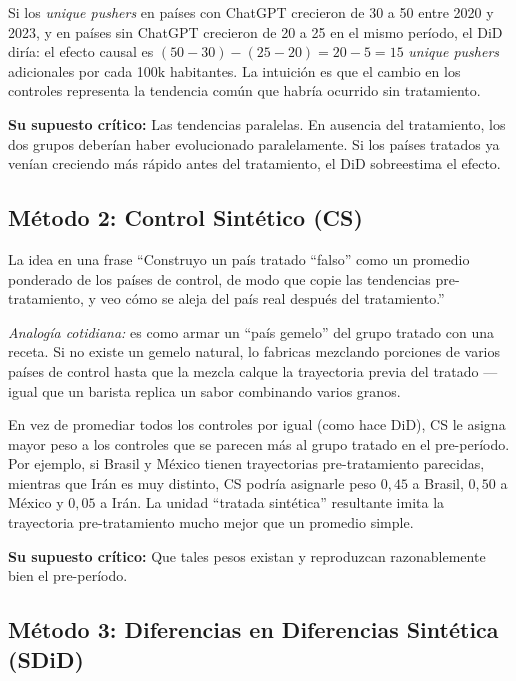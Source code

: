 \documentclass[11pt,a4paper]{article}
\begin{document}
Si los \textit{unique pushers} en países con ChatGPT crecieron de 30 a 50 entre 2020 y 2023, y en países sin ChatGPT crecieron de 20 a 25 en el mismo período, el DiD diría: el efecto causal es $(50-30) - (25-20) = 20 - 5 = 15$ \textit{unique pushers} adicionales por cada 100k habitantes. La intuición es que el cambio en los controles representa la tendencia común que habría ocurrido sin tratamiento.

\textbf{Su supuesto crítico:} Las tendencias paralelas. En ausencia del tratamiento, los dos grupos deberían haber evolucionado paralelamente. Si los países tratados ya venían creciendo más rápido antes del tratamiento, el DiD sobreestima el efecto.

\subsection{Método 2: Control Sintético (CS)}

\begin{ideabox}{La idea en una frase}
``Construyo un país tratado ``falso'' como un promedio ponderado de los países de control, de modo que copie las tendencias pre-tratamiento, y veo cómo se aleja del país real después del tratamiento.''
\end{ideabox}

\textit{Analogía cotidiana:} es como armar un ``país gemelo'' del grupo tratado con una receta. Si no existe un gemelo natural, lo fabricas mezclando porciones de varios países de control hasta que la mezcla calque la trayectoria previa del tratado —igual que un barista replica un sabor combinando varios granos.

En vez de promediar todos los controles por igual (como hace DiD), CS le asigna mayor peso a los controles que se parecen más al grupo tratado en el pre-período. Por ejemplo, si Brasil y México tienen trayectorias pre-tratamiento parecidas, mientras que Irán es muy distinto, CS podría asignarle peso $0{,}45$ a Brasil, $0{,}50$ a México y $0{,}05$ a Irán. La unidad ``tratada sintética'' resultante imita la trayectoria pre-tratamiento mucho mejor que un promedio simple.

\textbf{Su supuesto crítico:} Que tales pesos existan y reproduzcan razonablemente bien el pre-período.

\subsection{Método 3: Diferencias en Diferencias Sintética (SDiD)}
\end{document}
